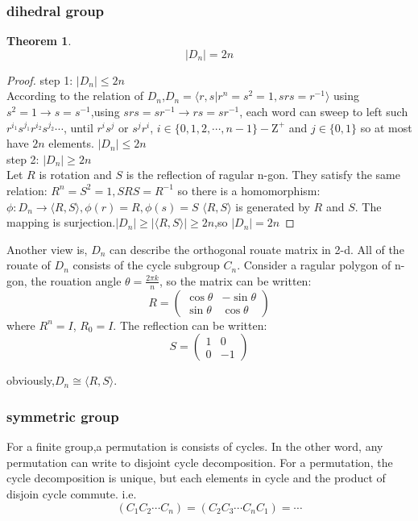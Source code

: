 \documentclass[10pt,a4paper]{article}
\newtheorem{theorem}{Theorem}[section]
\begin{document}
\subsubsection{dihedral group}
\begin{theorem}
    \[|D_n|=2n\]
\end{theorem}

\begin{proof}
    step 1: $|D_n|\le 2n$\\
    According to the relation of $D_n$,$D_n=\langle r,s|r^n=s^2=1,srs=r^{-1}\rangle$
    using $s^2=1\to s=s^{-1}$,using $srs=sr^{-1}\to rs=sr^{-1}$, each word can sweep to left such $r^{i_1}s^{j_1}r^{i_2}s^{j_2}\cdots$,
    until $r^is^j$ or $s^jr^i$, $i\in\{0,1,2,\cdots,n-1\}-\mathrm{Z}^+$ and $j\in\{0,1\}$ so at most have $2n$ elements. $|D_n|\le 2n$\\
    step 2: $|D_n|\ge2n$\\
    Let $R$ is rotation and $S$ is the reflection of ragular n-gon. They satisfy the same relation:
    $R^n=S^2=1,SRS=R^{-1}$
    so there is a homomorphism:
    $\phi:D_n\to\langle R,S\rangle,\phi(r)=R,\phi(s)=S$
    $\langle R,S\rangle$ is generated by $R$ and $S$. The mapping is surjection.$|D_n|\ge|\langle R,S\rangle|\ge 2n$,so $|D_n|=2n$
\end{proof}
Another view is, $D_n$ can describe the orthogonal rouate matrix in 2-d. All of the rouate of $D_n$ consists of the cycle subgroup $C_n$.
Consider a ragular polygon of n-gon, the rouation angle $\theta=\frac{2\pi k}{n}$, so the matrix can be written:
\[R=\begin{pmatrix}\cos\theta&-\sin\theta\\\sin\theta&\cos\theta\end{pmatrix}\]
where $R^n=I$, $R_0=I$. The reflection can be written:
\[S=\begin{pmatrix}1&0\\0&-1\end{pmatrix}\]

obviously,$D_{n}\cong\langle R,S\rangle$.
\subsubsection{symmetric group}
For a finite group,a permutation is consists of cycles. In the other word, any permutation can write to disjoint cycle decomposition.
For a permutation, the cycle decomposition is unique, but each elements in cycle and the product of disjoin cycle commute. i.e.
\[(C_1C_2\cdots C_n)=(C_2C_3\cdots C_nC_1)=\cdots\]
\end{document}

